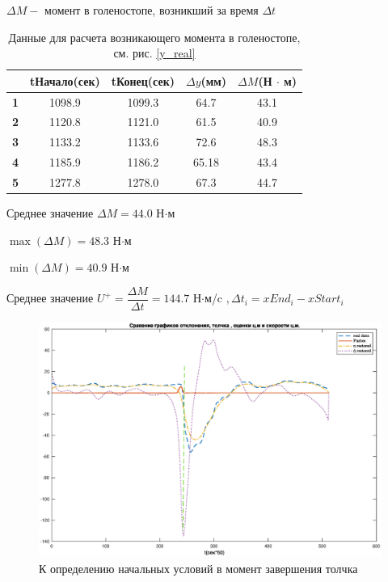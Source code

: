 \documentclass[a4paper,12pt, openany]{book}
\theoremstyle{plain} %
\theoremstyle{definition} %
\theoremstyle{remark} %
\numberwithin{equation}{chapter}
\begin{document}
{$\Delta M - $ момент в голеностопе, возникший за время $\Delta t$
\begin{table}[h!]
    \centering
    \begin{tabular}{|l|c|c|c|c|}
        \hline
        \textbf{}                                    &
        \multicolumn{1}{l|}{\textbf{tНачало(сек)}}    &
        \multicolumn{1}{l|}{\textbf{tКонец(сек)}}      &
        \multicolumn{1}{l|}{\textbf{$\Delta y$(мм)}} &
        \multicolumn{1}{l|}{\textbf{$\Delta M $(Н $\cdot$ м)}}                        \\ \hline
        \textbf{1}                                   & 1098.9 & 1099.3 & 64.7  & 43.1 \\ \hline
        \textbf{2}                                   & 1120.8 & 1121.0 & 61.5  & 40.9 \\ \hline
        \textbf{3}                                   & 1133.2 & 1133.6 & 72.6  & 48.3 \\ \hline
        \textbf{4}                                   & 1185.9 & 1186.2 & 65.18 & 43.4 \\ \hline
        \textbf{5}                                   & 1277.8 & 1278.0 & 67.3  & 44.7 \\ \hline
    \end{tabular}
    \caption{Данные для расчета возникающего момента в голеностопе, см. рис. \ref{y_real} }
    \label{moments_calculating}
\end{table}

Среднее значение $\Delta M=44.0$ Н$\cdot$м

$\max(\Delta M)=48.3$ Н$\cdot$м

$\min(\Delta M)=40.9$ Н$\cdot$м

Среднее значение $U^+=\dfrac{\Delta M}{\Delta t}=144.7$ Н$\cdot$м/c $,\Delta t_i=xEnd_i-xStart_i$
\begin{figure}[h!]
    \centering
    \includegraphics[width=0.99\linewidth]{all_real.eps}
    \caption{К определению начальных условий в момент завершения толчка}
    \label{all_real}
\end{figure}

}
\end{document}
